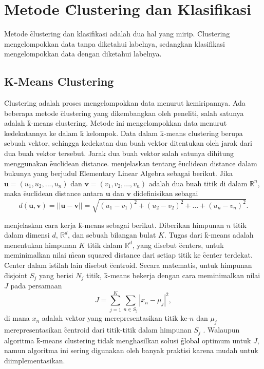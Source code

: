 \section{Metode \f{Clustering} dan Klasifikasi}
Metode \f{clustering} dan klasifikasi adalah dua hal yang mirip. \f{Clustering} mengelompokkan data tanpa diketahui labelnya, sedangkan klasifikasi mengelompokkan data dengan diketahui labelnya.

  \subsection{K-Means Clustering}
  \f{Clustering} adalah proses mengelompokkan data menurut kemiripannya. Ada beberapa metode \f{clustering} yang dikembangkan oleh peneliti, salah satunya adalah \f{k-means clustering}. Metode ini mengelompokkan data menurut kedekatannya ke dalam \f{k} kelompok. Data dalam \f{k-means clustering} berupa sebuah vektor, sehingga kedekatan dua buah vektor ditentukan oleh jarak dari dua buah vektor tersebut. Jarak dua buah vektor salah satunya dihitung menggunakan \f{euclidean distance}. \cite{anton2010elementary} menjelaskan tentang \f{euclidean distance} dalam bukunya yang berjudul \f{Elementary Linear Algebra} sebagai berikut. Jika $\mathbf{u} = (u_1,u_2,...,u_n)$ dan $\mathbf{v} = (v_1,v_2,...,v_n)$ adalah dua buah titik di dalam $\mathbb{R}^n$, maka \f{euclidean distance} antara $\mathbf{u}$ dan $\mathbf{v}$ didefinisikan sebagai
  \begin{equation} \label{equ:euclideandistance}
    d(\mathbf{u},\mathbf{v})=||\mathbf{u}-\mathbf{v}||=\sqrt{(u_1-v_1)^2+(u_2-v_2)^2+\dots+(u_n-v_n)^2}.
  \end{equation}
  
  \cite{kanungo2002efficient} menjelaskan cara kerja \f{k-means} sebagai berikut. Diberikan himpunan $n$ titik dalam dimensi $d$, $\mathbb{R}^d$, dan sebuah bilangan bulat $K$. Tugas dari \f{k-means} adalah menentukan himpunan $K$ titik dalam $\mathbb{R}^d$, yang disebut \f{centers}, untuk meminimalkan nilai \f{mean squared distance} dari setiap titik ke \f{center} terdekat. \f{Center} dalam istilah lain disebut \f{centroid}. Secara matematis, untuk himpunan \f{disjoint} $S_j$ yang berisi $N_j$ titik, \f{k-means} bekerja dengan cara meminimalkan nilai $J$ pada persamaan
  \begin{equation}
    J = \sum_{j=1}^{K}{\sum_{n\in S_j}{|x_n-\mu_j|^2}},
  \end{equation}
  di mana $x_n$ adalah vektor yang merepresentasikan titik ke-$n$ dan $\mu_j$ merepresentasikan \f{centroid} dari titik-titik dalam himpunan $S_j$ \citep{kmeans}. Walaupun algoritma \f{k-means clustering} tidak menghasilkan solusi \f{global optimum} untuk $J$, namun algoritma ini sering digunakan oleh banyak praktisi karena mudah untuk diimplementasikan.

